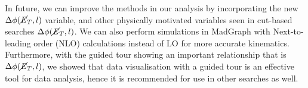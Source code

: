 In future, we can improve the methods in our analysis by incorporating the new $\Delta \phi(\cancel{\it{E}}_{T},l)$ variable, and other physically motivated variables seen in cut-based searches $\Delta \phi(\cancel{\it{E}}_{T},l)$. We can also perform simulations in MadGraph with Next-to-leading order (NLO) calculations instead of LO for more accurate kinematics. Furthermore, with the guided tour showing an important relationship that is $\Delta \phi(\cancel{\it{E}}_{T},l)$, we showed that data visualisation with a guided tour is an effective tool for data analysis, hence it is recommended for use in other searches as well.